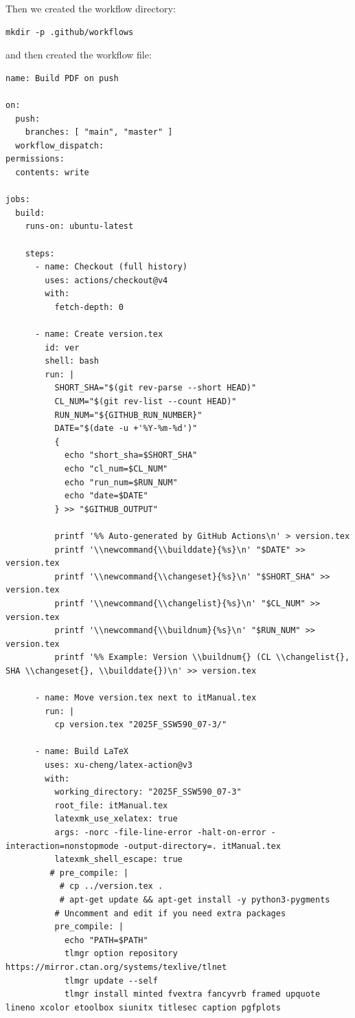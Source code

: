 Then we created the workflow directory:
\begin{verbatim}
mkdir -p .github/workflows
\end{verbatim}
and then created the workflow file:
\begin{verbatim}
name: Build PDF on push

on:
  push:
    branches: [ "main", "master" ]
  workflow_dispatch:
permissions:
  contents: write

jobs:
  build:
    runs-on: ubuntu-latest

    steps:
      - name: Checkout (full history)
        uses: actions/checkout@v4
        with:
          fetch-depth: 0

      - name: Create version.tex
        id: ver
        shell: bash
        run: |
          SHORT_SHA="$(git rev-parse --short HEAD)"
          CL_NUM="$(git rev-list --count HEAD)"
          RUN_NUM="${GITHUB_RUN_NUMBER}"
          DATE="$(date -u +'%Y-%m-%d')"
          {
            echo "short_sha=$SHORT_SHA"
            echo "cl_num=$CL_NUM"
            echo "run_num=$RUN_NUM"
            echo "date=$DATE"
          } >> "$GITHUB_OUTPUT"

          printf '%% Auto-generated by GitHub Actions\n' > version.tex
          printf '\\newcommand{\\builddate}{%s}\n' "$DATE" >> version.tex
          printf '\\newcommand{\\changeset}{%s}\n' "$SHORT_SHA" >> version.tex
          printf '\\newcommand{\\changelist}{%s}\n' "$CL_NUM" >> version.tex
          printf '\\newcommand{\\buildnum}{%s}\n' "$RUN_NUM" >> version.tex
          printf '%% Example: Version \\buildnum{} (CL \\changelist{}, SHA \\changeset{}, \\builddate{})\n' >> version.tex

      - name: Move version.tex next to itManual.tex
        run: |
          cp version.tex "2025F_SSW590_07-3/"

      - name: Build LaTeX
        uses: xu-cheng/latex-action@v3
        with:
          working_directory: "2025F_SSW590_07-3"
          root_file: itManual.tex
          latexmk_use_xelatex: true
          args: -norc -file-line-error -halt-on-error -interaction=nonstopmode -output-directory=. itManual.tex
          latexmk_shell_escape: true
         # pre_compile: |
           # cp ../version.tex .
           # apt-get update && apt-get install -y python3-pygments
          # Uncomment and edit if you need extra packages
          pre_compile: |
            echo "PATH=$PATH"
            tlmgr option repository https://mirror.ctan.org/systems/texlive/tlnet
            tlmgr update --self
            tlmgr install minted fvextra fancyvrb framed upquote lineno xcolor etoolbox siunitx titlesec caption pgfplots


\end{verbatim}
